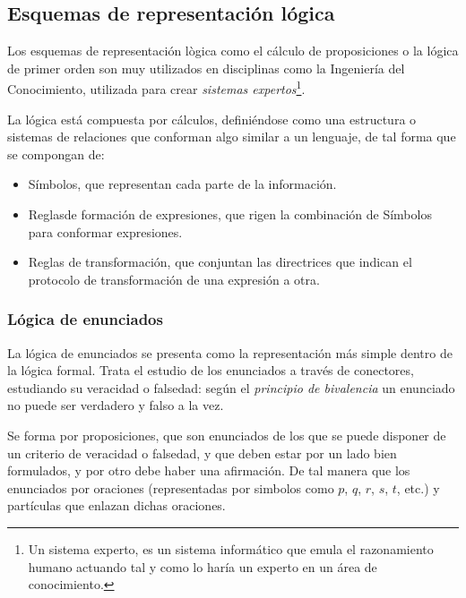 \documentclass[a4paper, 11pt, titlepage]{article}
\begin{document}
    \subsection{Esquemas de representación lógica}\label{esquemasrepresentacionlogica}

        Los esquemas de representación lògica como el cálculo de proposiciones o la lógica 
        de primer orden son muy utilizados en disciplinas como la Ingeniería del Conocimiento, 
        utilizada para crear \textit{sistemas expertos}\footnote{
            Un sistema experto, es un sistema informático que emula el razonamiento humano 
            actuando tal y como lo haría un experto en un área de conocimiento. 
        }.

        La lógica está compuesta por cálculos, definiéndose como una estructura o sistemas 
        de relaciones que conforman algo similar a un lenguaje, de tal forma que se 
        compongan de:

        \begin{itemize}
            \item Símbolos, que representan cada parte de la información.
            \item Reglasde formación de expresiones, que rigen la combinación de Símbolos 
            para conformar expresiones.
            \item Reglas de transformación, que conjuntan las directrices que indican el 
            protocolo de transformación de una expresión a otra.
        \end{itemize}

        \subsubsection{Lógica de enunciados}\label{logicaenunciados}

            La lógica de enunciados se presenta como la representación más simple dentro de la 
            lógica formal. Trata el estudio de los enunciados a través de conectores, estudiando 
            su veracidad o falsedad: según el \textit{principio de bivalencia} un enunciado 
            no puede ser verdadero y falso a la vez.

            Se forma por proposiciones, que son enunciados de los que se puede disponer de un 
            criterio de veracidad o falsedad, y que deben estar por un lado bien formulados, 
            y por otro debe haber una afirmación. De tal manera que los enunciados por oraciones
            (representadas por simbolos como $p$, $q$, $r$, $s$, $t$, etc.) 
            y partículas que enlazan dichas oraciones.
\end{document}
